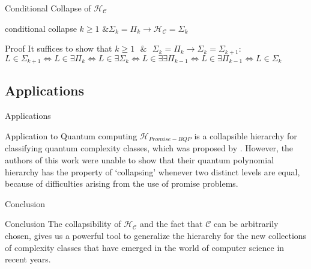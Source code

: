         \begin{frame}{Conditional Collapse of $\mathcal{H}_{\mathcal{C}}$}
            \begin{lemma}{conditional collapse}
                $k \geq 1 
                \text{ \& } 
                \Sigma_k = \Pi_k \to \mathcal{H}_{\mathcal{C}} = \Sigma_k$
            \end{lemma}
            \begin{block}{Proof}
                It suffices to show that 
                $k \geq 1 
                \text{ $\&$ } 
                \Sigma_k = \Pi_k 
                \to \Sigma_k = \Sigma_{k+1}$:\\
                $L \in \Sigma_{k+1} \iff L \in \exists \Pi_k \iff L \in \exists \Sigma_k \iff L 
                \in \exists \exists \Pi_{k-1} \iff L \in \exists \Pi_{k-1} \iff  L \in \Sigma_k$
            \end{block}
        \end{frame}
        
    \subsection{Applications}
        \begin{frame}{Applications}
            \begin{exampleblock}{Application to Quantum computing}
                $\mathcal{H}_{Promise-BQP}$ is a collapsible hierarchy for classifying quantum complexity classes, which was proposed by \cite{Gharibian}.  However, the authors of this work were unable to show that their quantum polynomial hierarchy has the property of ‘collapsing’ whenever two distinct levels are equal, because of difficulties arising from the use of promise problems.
            \end{exampleblock}
        \end{frame}
        
        \begin{frame}{Conclusion}
            \begin{block}{Conclusion}
                The collapsibility of $\mathcal{H}_{\mathcal{C}}$ and the fact that $\mathcal{C}$ 
                can be arbitrarily chosen, gives us a powerful tool to generalize the hierarchy for 
                the new collections of complexity classes that have emerged in the world of computer science in 
                recent years.
            \end{block}
        \end{frame}

